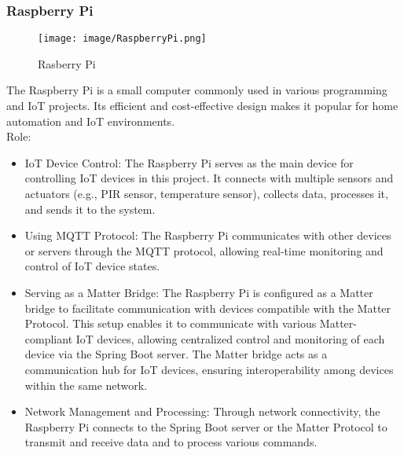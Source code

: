 \documentclass[conference]{IEEEtran}
\begin{document}
\subsubsection{Raspberry Pi}
\begin{figure}[h!]
    \centering
    \texttt{[image: image/RaspberryPi.png]}
\caption{Rasberry Pi}
    \label{fig:enter-label}
\end{figure}

\noindent The Raspberry Pi is a small computer commonly used in various programming and IoT projects. Its efficient and cost-effective design makes it popular for home automation and IoT environments.\\

Role:
\begin{itemize}
    \item IoT Device Control: The Raspberry Pi serves as the main device for controlling IoT devices in this project. It connects with multiple sensors and actuators (e.g., PIR sensor, temperature sensor), collects data, processes it, and sends it to the system.\\
    \item Using MQTT Protocol: The Raspberry Pi communicates with other devices or servers through the MQTT protocol, allowing real-time monitoring and control of IoT device states.\\
    \item Serving as a Matter Bridge: The Raspberry Pi is configured as a Matter bridge to facilitate communication with devices compatible with the Matter Protocol. This setup enables it to communicate with various Matter-compliant IoT devices, allowing centralized control and monitoring of each device via the Spring Boot server. The Matter bridge acts as a communication hub for IoT devices, ensuring interoperability among devices within the same network.\\
    \item Network Management and Processing: Through network connectivity, the Raspberry Pi connects to the Spring Boot server or the Matter Protocol to transmit and receive data and to process various commands.\\
\end{itemize}
\end{document}

